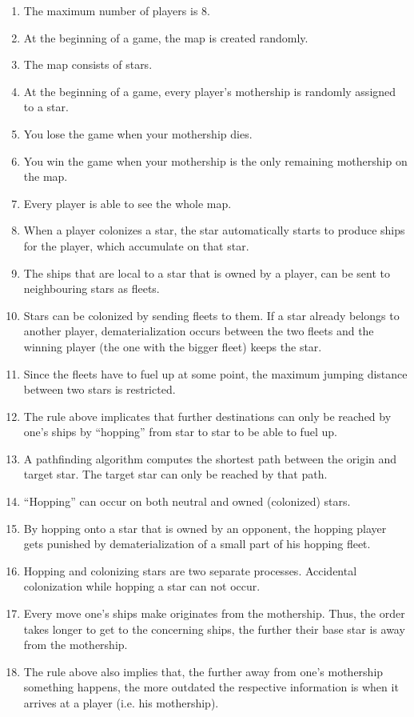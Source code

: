 \begin{enumerate}
	\item The maximum number of players is 8.
	\item At the beginning of a game, the map is created randomly.
	\item The map consists of stars.
	\item At the beginning of a game, every player's mothership is randomly assigned to a star.
	\item You lose the game when your mothership dies.
	\item You win the game when your mothership is the only remaining mothership on the map.
	\item Every player is able to see the whole map.
	\item When a player colonizes a star, the star automatically starts to produce ships for the player, which accumulate on that star.
	\item The ships that are local to a star that is owned by a player, can be sent to neighbouring stars as fleets.
	\item Stars can be colonized by sending fleets to them. If a star already belongs to another player, dematerialization occurs between the two fleets and the winning player (the one with the bigger fleet) keeps the star.
	\item Since the fleets have to fuel up at some point, the maximum jumping distance between two stars is restricted.
	\item The rule above implicates   that further destinations can only be reached by one's ships by ``hopping'' from star to star to be able to fuel up.
	\item A pathfinding algorithm computes the shortest path between the origin and target star. The target star can only be reached by that path.
	\item ``Hopping'' can occur on both neutral and owned (colonized) stars.
	\item By hopping onto a star that is owned by an opponent, the hopping player gets punished by dematerialization of a small part of his hopping fleet.
	\item Hopping and colonizing stars are two separate processes. Accidental colonization while hopping a star can not occur.
	\item Every move one’s ships make originates from the mothership. Thus, the order takes longer to get to the concerning ships, the further their base star is away from the mothership.
	\item The rule above also implies that, the further away from one's mothership something happens, the more outdated the respective information is when it arrives at a player (i.e. his mothership).

\end{enumerate}
